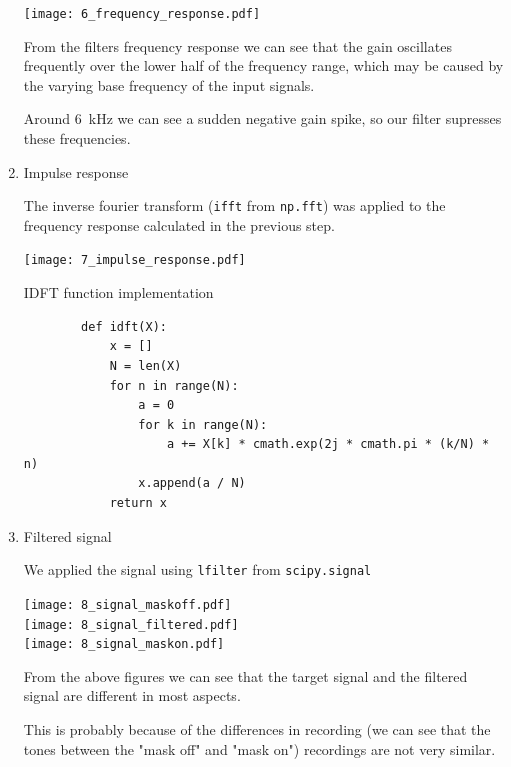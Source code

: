 \documentclass[a4paper, 11pt]{article}
\begin{document}
\begin{enumerate}
        \texttt{[image: 6\_frequency\_response.pdf]}

        From the filters frequency response we can see that the gain oscillates frequently
        over the lower half of the frequency range,
        which may be caused by the varying base frequency of the input signals.

        Around 6~kHz we can see a sudden negative gain spike,
        so our filter supresses these frequencies.

        \item
        Impulse response

        The inverse fourier transform (\texttt{ifft} from \texttt{np.fft})
        was applied to the frequency response calculated in the previous step.

        \texttt{[image: 7\_impulse\_response.pdf]}

        IDFT function implementation

        \begin{verbatim}
        def idft(X):
            x = []
            N = len(X)
            for n in range(N):
                a = 0
                for k in range(N):
                    a += X[k] * cmath.exp(2j * cmath.pi * (k/N) * n)
                x.append(a / N)
            return x
        \end{verbatim}

        \newpage

        \item
        Filtered signal

        We applied the signal using \texttt{lfilter} from \texttt{scipy.signal}

        \texttt{[image: 8\_signal\_maskoff.pdf]} \\
        \texttt{[image: 8\_signal\_filtered.pdf]} \\
        \texttt{[image: 8\_signal\_maskon.pdf]}

        From the above figures we can see that the target signal and the filtered signal are different in most aspects.

        This is probably because of the differences in recording
        (we can see that the tones between the "mask off" and "mask on") recordings are not very similar.


\end{enumerate}
\end{document}

